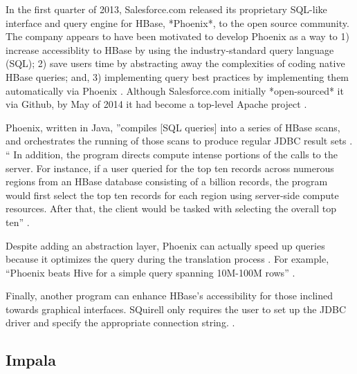      In the first quarter of 2013, Salesforce.com released its
     proprietary SQL-like interface and query engine for HBase,
     *Phoenix*, to the open source community.  The company appears to
     have been motivated to develop Phoenix as a way to 1) increase
     accessiblity to HBase by using the industry-standard query
     language (SQL); 2) save users time by abstracting away the
     complexities of coding native HBase queries; and, 3) implementing
     query best practices by implementing them automatically via
     Phoenix \cite{www-phoenix-cloudera}. Although Salesforce.com
     initially *open-sourced* it via Github, by May of 2014 it had
     become a top-level Apache project \cite{www-phoenix-wikipedia}.

     Phoenix, written in Java, ''compiles [SQL queries] into a series
     of HBase scans, and orchestrates the running of those scans to
     produce regular JDBC result sets \cite{www-apachephoenix-org}. ``
     In addition, the program directs compute intense portions of the
     calls to the server.  For instance, if a user queried for the top
     ten records across numerous regions from an HBase database
     consisting of a billion records, the program would first select
     the top ten records for each region using server-side compute
     resources.  After that, the client would be tasked with selecting
     the overall top ten'' \cite{www-phoenix-salesforcedev}.

     Despite adding an abstraction layer, Phoenix can actually speed
     up queries because it optimizes the query during the translation
     process \cite{www-phoenix-cloudera}. For example, ``Phoenix
     beats Hive for a simple query spanning 10M-100M rows''
     \cite{www-phoenix-infoq}.

     Finally, another program can enhance HBase's accessibility for
     those inclined towards graphical interfaces.  SQuirell only
     requires the user to set up the JDBC driver and specify the
     appropriate connection string. \cite{www-phoenix-bighadoop}.

\subsection{ Impala}

